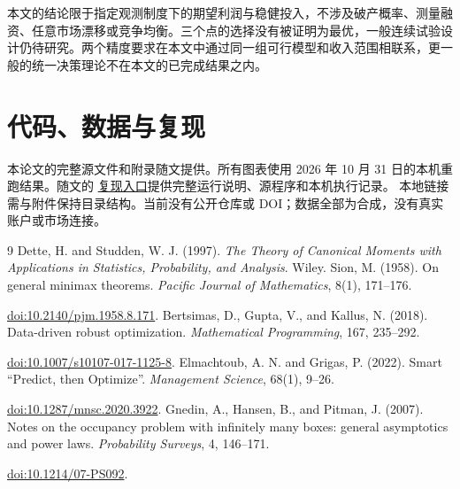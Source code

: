 本文的结论限于指定观测制度下的期望利润与稳健投入，不涉及破产概率、测量融资、任意市场漂移或竞争均衡。三个点的选择没有被证明为最优，一般连续试验设计仍待研究。两个精度要求在本文中通过同一组可行模型和收入范围相联系，更一般的统一决策理论不在本文的已完成结果之内。

\section*{代码、数据与复现}
本论文的完整源文件和附录随文提供。所有图表使用 2026 年 10 月 31 日的本机重跑结果。随文的
\href{README.md}{复现入口}提供完整运行说明、源程序和本机执行记录。
本地链接需与附件保持目录结构。当前没有公开仓库或 DOI；数据全部为合成，没有真实账户或市场连接。

\begingroup\small
\begin{thebibliography}{9}
\setlength{\itemsep}{2pt}
 Dette, H. and Studden, W. J. (1997).
\emph{The Theory of Canonical Moments with Applications in Statistics, Probability, and Analysis}. Wiley.
 Sion, M. (1958). On general minimax theorems.
\emph{Pacific Journal of Mathematics}, 8(1), 171--176.\par
\href{https://doi.org/10.2140/pjm.1958.8.171}{doi:10.2140/pjm.1958.8.171}.
 Bertsimas, D., Gupta, V., and Kallus, N. (2018).
Data-driven robust optimization. \emph{Mathematical Programming}, 167, 235--292.\par
\href{https://doi.org/10.1007/s10107-017-1125-8}{doi:10.1007/s10107-017-1125-8}.
 Elmachtoub, A. N. and Grigas, P. (2022).
Smart ``Predict, then Optimize''. \emph{Management Science}, 68(1), 9--26.\par
\href{https://doi.org/10.1287/mnsc.2020.3922}{doi:10.1287/mnsc.2020.3922}.
 Gnedin, A., Hansen, B., and Pitman, J. (2007).
Notes on the occupancy problem with infinitely many boxes: general asymptotics and power laws.
\emph{Probability Surveys}, 4, 146--171.\par
\href{https://doi.org/10.1214/07-PS092}{doi:10.1214/07-PS092}.
\end{thebibliography}
\endgroup
